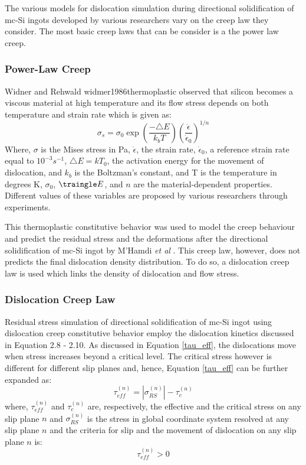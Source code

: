The various models for dislocation simulation during directional solidification of mc-Si ingots developed by various researchers \cite{takahashi2010generation,nakano2011numerical,meese2006thermo} vary on the creep law they consider. The most basic creep laws that can be consider is a the power law creep.

\subsubsection{Power-Law Creep }
Widner and Rehwald widmer1986thermoplastic observed that silicon becomes a viscous material at high temperature and its flow stress depends on both temperature and strain rate which is given as:
\begin{equation}
\sigma_{s} = \sigma_{0} \exp \left ( \frac{-\triangle E}{k_{b} T} \right ) \left ( \frac{\dot{\epsilon}}{\dot{\epsilon}_{0}} \right ) ^{1/n}
\label {power-creep}
\end{equation}
Where, $\sigma$ is the Mises stress in Pa, $\dot{\epsilon}$, the strain rate, $\dot{\epsilon}_{0}$, a reference strain rate equal to $10^{-3} s^{-1}$, $\triangle E = k T_{0}$, the activation energy for the movement of dislocation, and $k_{b}$ is the Boltzman's constant, and T is the temperature in degrees K, $\sigma_{0}$, $\traingle E$, and $n$ are the material-dependent properties. Different values of these variables are proposed by various researchers \cite{patel1963macroscopic,siethoff1968lattice,yonenaga1978dislocation} through experiments.

This thermoplastic constitutive behavior was used to model the creep behaviour and predict the residual stress and the deformations after the directional solidification of mc-Si ingot by M'Hamdi \textit{et al} \cite{meese2006thermo}. This creep law, however, does not predicts the final dislocation density distribution. To do so, a dislocation creep law is used which links the density of dislocation and flow stress. 

\subsubsection{Dislocation Creep Law}

Residual stress simulation of directional solidification of mc-Si ingot using dislocation creep constitutive behavior employ the dislocation kinetics discussed in Equation 2.8 - 2.10. As discussed in Equation \ref{tau_eff}, the dislocations move when stress increases beyond a critical level. The critical stress however is different for different slip planes \cite{miyazaki2007dislocation} and, hence, Equation \ref{tau_eff} can be further expanded as:  
\begin{equation}
\tau^{(n)}_{eff} =  \left | \sigma^{(n)}_{RS} \right | - \tau^{(n)}_{c}
\label {cr-slip}
\end{equation}
where, $\tau^{(n)}_{eff}$ and $\tau^{(n)}_{c}$ are, respectively, the effective and the critical stress on any slip plane $n$ and $\sigma^{(n)}_{RS}$ is the stress in global coordinate system resolved at any slip plane $n$ and the criteria for slip and the movement of dislocation on any slip plane $n$ is:
\[ \tau^{(n)}_{eff} > 0 \] 

